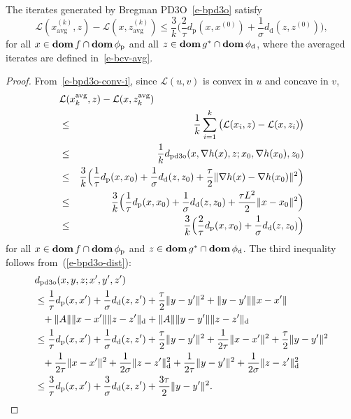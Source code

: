 \documentclass[letterpaper,11pt]{article}
\newcommand{\BEAS}{\begin{eqnarray*}}
\newcommand{\EEAS}{\end{eqnarray*}}
\newcommand{\dom}{\mathop{\bf dom}}
\newcommand{\avg}{\mathrm{avg}}
\newcommand{\primal}{\mathrm p}
\newcommand{\dual}{\mathrm d}
\newcommand{\cL}{\mathcal L}
\begin{document}
The iterates generated by Bregman PD3O~\eqref{e-bpd3o} satisfy
\[
\cL(x^{(k)}_\avg, z)-\cL(x, z^{(k)}_\avg)
\leq \frac{3}{k} \Big(\frac{2}{\tau} d_\primal (x,x^{(0)})
+ \frac{1}{\sigma} d_\dual (z,z^{(0)}) \Big),
\]
for all $x \in \dom f \cap \dom \phi_\primal$ and 
all $z \in \dom g^\ast \cap \dom \phi_\dual$,
where the averaged iterates are defined in~\eqref{e-bcv-avg}.
\begin{proof}
From~\eqref{e-bpd3o-conv-i},
since $\cL(u,v)$ is convex in $u$ and concave in $v$,
\BEAS
\lefteqn{\cL(x^\avg_k, z) - \cL(x, z^\avg_k)} \\
  &\leq &\frac{1}{k} \sum_{i=1}^k
  \big(\cL(x_i,z)-\cL(x,z_i)\big) \\
&\leq & \frac{1}{k}
  d_\mathrm{pd3o}(x,\nabla h(x), z;x_0,\nabla h(x_0), z_0) \\
&\leq & \frac{3}{k} \Big(\frac{1}{\tau} d_\primal (x,x_0)
  + \frac{1}{\sigma} d_\dual (z,z_0) + \frac{\tau}{2}
  \|\nabla h(x)-\nabla h(x_0)\|^2 \Big) \\
&\leq & \frac{3}{k} \Big(\frac{1}{\tau} d_\primal (x,x_0)
  + \frac{1}{\sigma} d_\dual (z,z_0) + \frac{\tau L^2}{2}
  \|x-x_0\|^2 \Big) \\
&\leq & \frac{3}{k} \Big(\frac{2}{\tau} d_\primal (x,x_0)
  + \frac{1}{\sigma} d_\dual (z,z_0) \Big)
\EEAS
for all $x\in \dom f \cap \dom \phi_\primal$ and
$z \in \dom g^\ast \cap \dom \phi_\dual$.
The third inequality follows from~(\ref{e-bpd3o-dist}):
\begin{align*}
&d_\mathrm{pd3o}(x,y,z;x',y',z') \\
&\mbox{} \leq \frac{1}{\tau}d_\mathrm p(x,x')
 + \frac{1}{\sigma} d_\mathrm d(z,z') + \frac{\tau}{2} \|y-y'\|^2
 + \|y-y'\|\|x-x'\| \\
& \mbox{} \phantom{\leq}
 + \|A\| \|x-x'\|\|z-z'\|_\mathrm d + \|A\| \|y-y'\|\|z-z'\|_\mathrm d \\
&\mbox{} \leq \frac{1}{\tau}d_\mathrm p(x,x')
 + \frac{1}{\sigma} d_\mathrm d(z,z') + \frac{\tau}{2} \|y-y'\|^2
 + \frac{1}{2\tau} \|x-x'\|^2 + \frac{\tau}{2} \|y-y'\|^2 \\
& \mbox{} \phantom{\leq}
 + \frac{1}{2\tau} \|x-x'\|^2 + \frac{1}{2\sigma} \|z-z'\|_\mathrm d^2
 + \frac{1}{2\tau} \|y-y'\|^2 + \frac{1}{2\sigma} \|z-z'\|_\mathrm d^2 \\
&\mbox{} \leq \frac{3}{\tau} d_\primal(x,x')
 + \frac{3}{\sigma} d_\dual(z,z') + \frac{3\tau}{2} \|y-y'\|^2.
\qedhere
\end{align*}
\end{proof}
\end{document}
